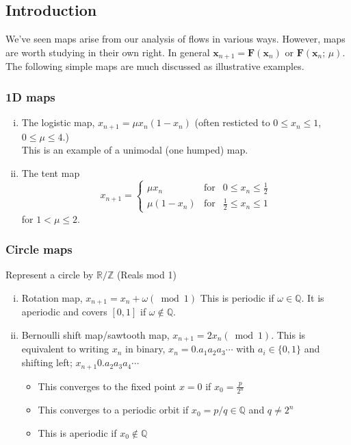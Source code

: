 \documentclass{article}
\newcommand{\bx}{\bm{x}}                                    %
\begin{document}
\subsection{Introduction}
We've seen maps arise from our analysis of flows in various ways.
However, maps are worth studying in their own right. In general
$\bx_{n+1} = \bm{F}(\bx_{n})$ or $\bm{F}(\bx_n;\, \mu)$. The following simple
maps are much discussed as illustrative examples.
\subsubsection*{1D maps}
\begin{enumerate}[(i)]
\item The logistic map, $x_{n+1} = \mu x_n(1-x_n)$ (often resticted to 
      $0 \leq x_n \leq 1$, $0 \leq \mu \leq 4$.)
      \\
      This is an example of a unimodal (one humped) map.
\item The tent map
      \[ x_{n+1} = \left\{ \begin{array}{ccc} 
      \mu x_n & \mbox{for} & 0 \leq x_n \leq \frac{1}{2} \\
      \mu (1-x_n) & \mbox{for} & \frac{1}{2} \leq x_n \leq 1
      \end{array} \right. \]
      for $1 < \mu \leq 2$.
\end{enumerate}
\subsubsection*{Circle maps}
Represent a circle by $\mathbb{R}/\mathbb{Z}$ (Reals mod 1)
\begin{enumerate}[(i)]
\item Rotation map, $x_{n+1} = x_n + \omega (\bmod 1)$
      This is periodic if $\omega \in \mathbb{Q}$. It is aperiodic 
      and covers $[0,1]$ if $\omega \not\in \mathbb{Q}$.
\item Bernoulli shift map/sawtooth map, $x_{n+1} = 2x_n (\bmod 1)$.
      This is equivalent to writing $x_n$ in binary, $x_n = 0.a_1a_2a_3\cdots$
      with $a_i \in \{0,1\}$ and shifting left; $x_{n+1} 0.a_2a_3a_4\cdots$
      \begin{itemize}
      \item This converges to the fixed point $x=0$ if $\displaystyle 
            x_0 =\frac{p}{2^n}$
      \item This converges to a periodic orbit if $x_0= p/q \in \mathbb{Q}$
            and $q \neq 2^n$
      \item This is aperiodic if $x_0 \not\in \mathbb{Q}$
      \end{itemize} 
\end{enumerate}
\end{document}
